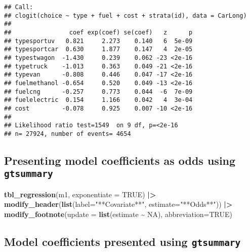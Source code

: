 \documentclass[
  11pt,
]{article}
\newenvironment{Shaded}{\begin{snugshade}}{\end{snugshade}}
\newcommand{\AttributeTok}[1]{\textcolor[rgb]{0.13,0.29,0.53}{#1}}
\newcommand{\ConstantTok}[1]{\textcolor[rgb]{0.56,0.35,0.01}{#1}}
\newcommand{\FunctionTok}[1]{\textcolor[rgb]{0.13,0.29,0.53}{\textbf{#1}}}
\newcommand{\NormalTok}[1]{#1}
\newcommand{\SpecialCharTok}[1]{\textcolor[rgb]{0.81,0.36,0.00}{\textbf{#1}}}
\newcommand{\StringTok}[1]{\textcolor[rgb]{0.31,0.60,0.02}{#1}}
\begin{document}
\begin{verbatim}
## Call:
## clogit(choice ~ type + fuel + cost + strata(id), data = CarLong)
## 
##                coef exp(coef) se(coef)   z      p
## typesportuv   0.821     2.273    0.140   6  5e-09
## typesportcar  0.630     1.877    0.147   4  2e-05
## typestwagon  -1.430     0.239    0.062 -23 <2e-16
## typetruck    -1.013     0.363    0.049 -21 <2e-16
## typevan      -0.808     0.446    0.047 -17 <2e-16
## fuelmethanol -0.654     0.520    0.049 -13 <2e-16
## fuelcng      -0.257     0.773    0.044  -6  7e-09
## fuelelectric  0.154     1.166    0.042   4  3e-04
## cost         -0.078     0.925    0.007 -10 <2e-16
## 
## Likelihood ratio test=1549  on 9 df, p=<2e-16
## n= 27924, number of events= 4654
\end{verbatim}

\normalsize

\hypertarget{presenting-model-coefficients-as-odds-using-gtsummary}{%
\subsection{\texorpdfstring{Presenting model coefficients as odds using
\texttt{gtsummary}}{Presenting model coefficients as odds using gtsummary}}\label{presenting-model-coefficients-as-odds-using-gtsummary}}

\small

\begin{Shaded}
\begin{Highlighting}[]
\FunctionTok{tbl\_regression}\NormalTok{(m1, }\AttributeTok{exponentiate =} \ConstantTok{TRUE}\NormalTok{) }\SpecialCharTok{|\textgreater{}} 
  \FunctionTok{modify\_header}\NormalTok{(}\FunctionTok{list}\NormalTok{(}\AttributeTok{label=}\StringTok{"**Covariate**"}\NormalTok{,}
                     \AttributeTok{estimate=}\StringTok{"**Odds**"}\NormalTok{)) }\SpecialCharTok{|\textgreater{}}
  \FunctionTok{modify\_footnote}\NormalTok{(}\AttributeTok{update =} \FunctionTok{list}\NormalTok{(estimate }\SpecialCharTok{\textasciitilde{}} \ConstantTok{NA}\NormalTok{), }
                  \AttributeTok{abbreviation=}\ConstantTok{TRUE}\NormalTok{)}
\end{Highlighting}
\end{Shaded}

\normalsize

\hypertarget{model-coefficients-presented-using-gtsummary}{%
\subsection{\texorpdfstring{Model coefficients presented using
\texttt{gtsummary}}{Model coefficients presented using gtsummary}}\label{model-coefficients-presented-using-gtsummary}}
\end{document}
